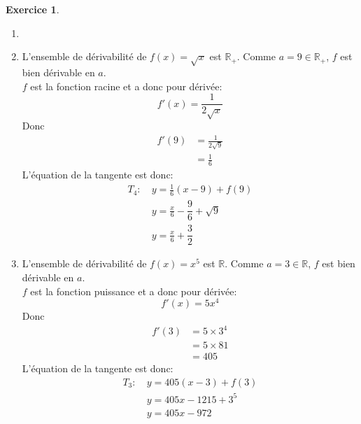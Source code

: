 \documentclass{exam}
\theoremstyle{definition}
\newtheorem{exercice}{Exercice}
\begin{document}
\begin{exercice}
    \begin{enumerate}
        \item[]
        \item L'ensemble de dérivabilité de $f(x) = \sqrt{x}$ est $\mathbb{R}_+$. Comme $a = 9 \in \mathbb{R}_+$, $f$ est bien dérivable en $a$.\\
        $f$ est la fonction racine et a donc pour dérivée:
        $$
            f'(x) = \frac{1}{2\sqrt{x}}
        $$
        Donc
        \begin{align*}
            f'(9) &= \frac{1}{2\sqrt{9}}\\
            &= \frac{1}{6}
        \end{align*}
        L'équation de la tangente est donc:
        \begin{align*}
            T_4:\ & y = \frac{1}{6}(x - 9) + f(9)\\
            & y = \frac{x}{6} - \dfrac{9}{6} + \sqrt{9}\\
            & y = \frac{x}{6} + \dfrac{3}{2}
        \end{align*}
        \item L'ensemble de dérivabilité de $f(x) = x^5$ est $\mathbb{R}$. Comme $a = 3 \in \mathbb{R}$, $f$ est bien dérivable en $a$.\\
        $f$ est la fonction puissance et a donc pour dérivée:
        $$
            f'(x) = 5x^4
        $$
        Donc
        \begin{align*}
            f'(3) &= 5\times3^4\\
            &= 5\times81\\
            &= 405
        \end{align*}
        L'équation de la tangente est donc:
        \begin{align*}
            T_3:\ & y = 405(x - 3) + f(3)\\
            & y = 405x - 1215 + 3^5\\
            & y = 405x - 972
        \end{align*}
    \end{enumerate}
\end{exercice}
\end{document}
